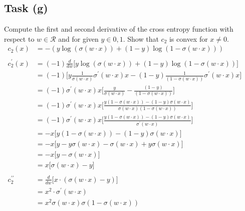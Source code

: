 \documentclass[onecolumn]{article}
\begin{document}
\subsection{Task (g)}
Compute the first and second derivative of the cross entropy function with respect to $w \in \mathcal{R}$ and for given $y \in {0,1}$. Show that $c_2$ is convex for $x \neq 0$.
\begin{align*}
	c_2(x) &= -(y \log(\sigma(w \cdot x)) + (1-y)\log(1-\sigma(w \cdot x))) && \\
	\\
	c_2^{\prime}(x) &= (-1) \frac{d}{dw} \Big[y \log(\sigma(w \cdot x)) + (1-y)\log(1-\sigma(w \cdot x))\Big] && \\
	&= (-1) \Big[y \frac{1}{\sigma(w \cdot x)} \sigma^\prime(w \cdot x) x - (1-y) \frac{1}{(1-\sigma(w \cdot x))} \sigma^\prime(w \cdot x) x\Big] && \\
	&= (-1) \sigma^\prime(w \cdot x)x\Big[\frac{y}{\sigma(w \cdot x)} - \frac{(1-y)}{(1-\sigma(w \cdot x))} \Big] && \\
	&= (-1) \sigma^\prime(w \cdot x)x\Big[\frac{y (1-\sigma(w \cdot x)) - (1-y)\sigma(w \cdot x)}{\sigma(w \cdot x)(1-\sigma(w \cdot x))}\Big] && \\
	&= (-1) \sigma^\prime(w \cdot x)x\Big[\frac{y (1-\sigma(w \cdot x)) - (1-y)\sigma(w \cdot x)}{\sigma^\prime(w \cdot x)}\Big] && \\
	&= -x \Big[y (1-\sigma(w \cdot x)) - (1-y)\sigma(w \cdot x)\Big] && \\
	&= -x \Big[y - y\sigma(w \cdot x) - \sigma(w \cdot x) + y\sigma(w \cdot x)\Big] && \\
	&= -x \Big[y - \sigma(w \cdot x)\Big] && \\
	&= x \Big[\sigma(w \cdot x) - y\Big] && \\
	\\
	c_2^{\prime\prime} &= \frac{d}{dw} \Big[x \cdot (\sigma(w \cdot x) - y)\Big] && \\
	&= x^2 \cdot \sigma^\prime(w \cdot x) && \\
	&= x^2 \sigma(w \cdot x) \sigma(1 - \sigma(w \cdot x))
\end{align*}
\end{document}
